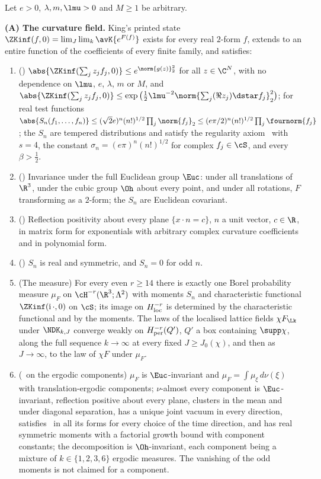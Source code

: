 \begin{theorem}\label{thm:s01:main}
Let $e>0$, $\lambda,m,\lmu>0$ and $M\ge1$ be arbitrary.

\medskip\noindent\textbf{(A) The curvature field.} King's printed state
$\ZKinf(f,0)=\lim_{J}\lim_{k}\avK{e^{F(f)}}$ exists for every real $2$-form $f$, extends to an entire
function of the coefficients of every finite family, and satisfies:
\begin{enumerate}[label=\textup{(\roman*)},leftmargin=*]
\item \textup{(\OSz)} $\abs{\ZKinf(\sum_jz_jf_j,0)}\le e^{\norm{g(z)}_2^2}$ for all $z\in\C^N$, with no
dependence on $\lmu$, $e$, $\lambda$, $m$ or $M$, and
$\abs{\ZKinf(\sum_jz_jf_j,0)}\le\exp\big(\tfrac12\lmu^{-2}\norm{\sum_j(\Re z_j)\dstar f_j}_2^2\big)$;
for real test functions $\abs{S_n(f_1,\dots,f_n)}\le(\sqrt2e)^n(n!)^{1/2}\prod_j\norm{f_j}_2
\le(e\pi/2)^n(n!)^{1/2}\prod_j\fournorm{f_j}$; the $S_n$ are tempered distributions and satisfy the
regularity axiom \Ezz\ with $s=4$, the constant $\sigma_n=(e\pi)^n(n!)^{1/2}$ for complex
$f_j\in\cS$, and every $\beta>\tfrac12$.
\item \textup{(\OSo)} Invariance under the full Euclidean group $\Euc$: under all translations of
$\R^3$, under the cubic group $\Oh$ about every point, and under all rotations, $F$ transforming as a
$2$-form; the $S_n$ are Euclidean covariant.
\item \textup{(\OSt)} Reflection positivity about every plane $\{x\cdot n=c\}$, $n$ a unit vector,
$c\in\R$, in matrix form for exponentials with arbitrary complex curvature coefficients and in polynomial
form.
\item \textup{(\OSth)} $S_n$ is real and symmetric, and $S_n=0$ for odd $n$.
\item \textup{(The measure)} For every even $r\ge14$ there is exactly one Borel probability measure
$\mu_F$ on $\cH^{-r}(\R^3;\Lambda^2)$ with moments $S_n$ and characteristic functional
$\ZKinf(\mathrm i\,\cdot,0)$ on $\cS$; its image on $H^{-r}_{\rm loc}$ is determined by the characteristic
functional and by the moments. The laws of the localised lattice fields $\chi F_{\Lk}$ under $\NDK_{k,J}$
converge weakly on $H^{-r}_{\rm per}(Q')$, $Q'$ a box containing $\supp\chi$, along the full sequence
$k\to\infty$ at every fixed $J\ge J_0(\chi)$, and then as $J\to\infty$, to the law of $\chi F$ under
$\mu_F$.
\item \textup{(\OSf\ on the ergodic components)} $\mu_F$ is $\Euc$-invariant and $\mu_F=\int\mu_\xi\,d\nu(\xi)$
with translation-ergodic components; $\nu$-almost every component is $\Euc$-invariant, reflection positive
about every plane, clusters in the mean and under diagonal separation, has a unique joint vacuum in every
direction, satisfies \OSf\ in all its forms for every choice of the time direction, and has real symmetric
moments with a factorial growth bound with component constants; the decomposition is $\Oh$-invariant, each
component being a mixture of $k\in\{1,2,3,6\}$ ergodic measures. The vanishing of the odd moments is not
claimed for a component.
\end{enumerate}


\end{theorem}
